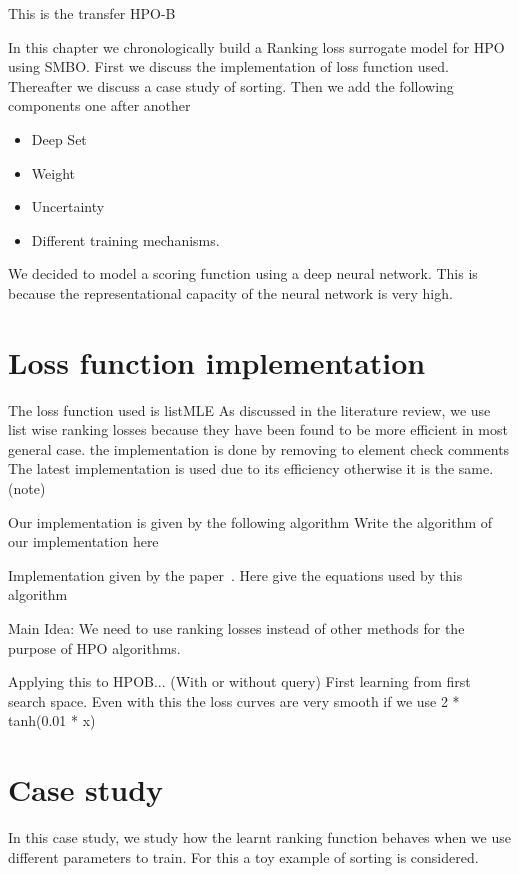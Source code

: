 \documentclass[11pt]{report}
\begin{document}
This is the transfer HPO-B

In this chapter we chronologically build a Ranking loss surrogate model for HPO using SMBO.
First we discuss the implementation of loss function used.
Thereafter we discuss a case study of sorting.
Then we add the following components one after another

\begin{itemize}
\item Deep Set
\item Weight
\item Uncertainty
\item Different training mechanisms.
\end{itemize}

We decided to model a scoring function using a deep neural network.
This is because the representational capacity of the neural network is very high.


\section{Loss function implementation}
The loss function used is listMLE
As discussed in the literature review,  we use list wise ranking losses because they have been found to be more efficient in most general case.
the implementation is done by removing to element check comments
The latest implementation is used due to its efficiency otherwise it is the same. (note)

Our implementation is given by the following algorithm
Write the algorithm of our implementation here

Implementation given by the paper~\cite{Pobrotyn2020ContextAwareLT}.
Here give the equations used by this algorithm

Main Idea:
    We need to use ranking losses instead of other methods for the purpose of HPO algorithms.


Applying this to HPOB... (With or without query)
    First learning from first search space.
    Even with this the loss curves are very smooth if we use 2 * tanh(0.01 * x)

    
\section{Case study}

In this case study,  we study how the learnt ranking function behaves when we use different parameters to train.
For this a toy example of sorting is considered.
\end{document}
